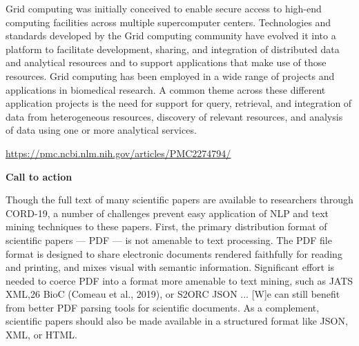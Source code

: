 \documentclass[11pt]{article}
\begin{document}
\begin{blockQuote}

Grid computing was initially conceived to enable secure access to high-end computing facilities across multiple supercomputer centers.   Technologies and standards developed by the Grid computing community have evolved it into a platform to facilitate development, sharing, and integration of distributed data and analytical resources and to support applications that make use of those resources. Grid computing has been employed in a wide range of projects and applications in biomedical research. A common theme across these different application projects is the need for support for query, retrieval, and integration of data from heterogeneous resources, discovery of relevant resources, and analysis of data using one or more analytical services. 
\end{blockQuote}

\vspace{6pt}
\hfill{}

\hfill\href{https://pmc.ncbi.nlm.nih.gov/articles/PMC2274794/}{https://pmc.ncbi.nlm.nih.gov/articles/PMC2274794/}

\vspace*{6pt}


\begin{blockQuote}

\textbf{Call to action}

\vspace*{4pt}

Though the full text of many scientific papers are
available to researchers through CORD-19, a number of 
challenges prevent easy application of NLP
and text mining techniques to these papers. First,
the primary distribution format of scientific papers
--- PDF --- is not amenable to text processing. The
PDF file format is designed to share electronic documents rendered faithfully for reading and printing, and mixes visual with semantic information.
Significant effort is needed to coerce PDF into a
format more amenable to text mining, such as JATS
XML,26 BioC (Comeau et al., 2019), or S2ORC
JSON ... [W]e can still benefit from better PDF parsing tools
for scientific documents. As a complement, 
scientific papers should also be made available in a
structured format like JSON, XML, or HTML.
\end{blockQuote}
\end{document}
